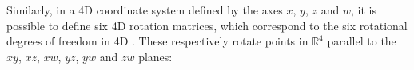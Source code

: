 \blockmargin%
\hspace{-\marginparwidth}\hspace{-\marginparsep}
\unblockmargin%

Similarly, in a 4D coordinate system defined by the axes $x$, $y$, $z$ and $w$, it is possible to define six 4D rotation matrices, which correspond to the six rotational degrees of freedom in 4D \citep{Hanson94}.
These respectively rotate points in $\mathbb{R}^4$ parallel to the $xy$, $xz$, $xw$, $yz$, $yw$ and $zw$ planes:

